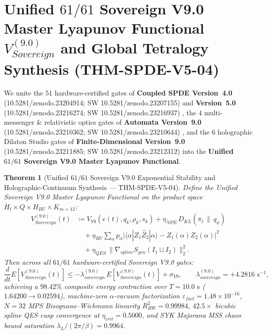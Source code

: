 \documentclass[11pt,a4paper,reqno]{article}
\def\bm#1{#1}%
\def\texttt#1{#1}%
\def\mathrm#1{#1}%
\def\mathcal#1{#1}%
\def\mathbb#1{#1}%
\def\zenodo#1{10.5281/zenodo.#1}%
\newcommand{\zenodo}[1]{\href{https://doi.org/10.5281/zenodo.#1}{\texttt{10.5281/\allowbreak zenodo.#1}}}
\theoremstyle{plain}
\newtheorem{theorem}{Theorem}[section]
\theoremstyle{definition}
\theoremstyle{remark}
\numberwithin{equation}{section}
\begin{document}
\section{Unified \texorpdfstring{$61/61$}{61/61} Sovereign V9.0 Master Lyapunov Functional \texorpdfstring{$\mathcal{V}_{\mathrm{Sovereign}}^{(9.0)}$}{V\_Sovereign\^(9.0)} and Global Tetralogy Synthesis (\texttt{THM-SPDE-V5-04})}
\label{sec:spde_v5_master_lyapunov_61_gates}

We unite the $51$ hardware-certified gates of \textbf{Coupled SPDE Version~4.0} (\zenodo{23204914}; SW \zenodo{23207155}) and \textbf{Version~5.0} (\zenodo{23216274}; SW \zenodo{23216937}) \cite{ananda2026spde_v50}, the $4$ multi-messenger \& relativistic optics gates of \textbf{Automata Version~9.0} (\zenodo{23210362}; SW \zenodo{23210644}) \cite{ananda2026automata_v90}, and the $6$ holographic Dilaton Studio gates of \textbf{Finite-Dimensional Version~9.0} (\zenodo{23211885}; SW \zenodo{23212312}) \cite{ananda2026finite_v90} into the \textbf{Unified $61/61$ Sovereign V9.0 Master Lyapunov Functional}.

\begin{theorem}[{Unified $61/61$ Sovereign V9.0 Exponential Stability and Holographic-Continuum Synthesis --- \texttt{THM-SPDE-V5-04}}]\label{thm:spde_v5_master_61_gates}
Define the Unified Sovereign V9.0 Master Lyapunov Functional on the product space $\dot{H}_t \times Q \times \mathcal{H}_{\mathrm{BU}} \times \mathcal{K}_{m=12}$:
\begin{align}\label{eq:spde_v5_master_lyapunov}
  \mathcal{V}_{\mathrm{Sovereign}}^{(9.0)}(t) &\coloneqq \mathcal{V}_{\mathrm{V8}}\!\left(e(t), q_k, \rho_k, s_k\right) + \eta_{\mathrm{NPE}}\,D_{\mathrm{KL}}\!\left(\pi_t \,\|\, q_\phi\right) \nonumber\\
  &\quad + \eta_{\mathrm{BU}}\sum_{\alpha} p_\alpha \bigl|\langle\alpha|\widehat{Z}_1\widehat{Z}_2|\alpha\rangle - Z_1(\alpha)Z_2(\alpha)\bigr|^2 \nonumber\\
  &\quad + \eta_{\mathrm{QES}}\,\bigl\|\nabla_{\mathrm{spline}} S_{\mathrm{gen}}(I_1 \sqcup I_2)\bigr\|_2^2.
\end{align}
Then across all $61/61$ hardware-certified Sovereign V9.0 gates:
\begin{equation}\label{eq:spde_v5_master_decay}
  \frac{\mathrm{d}}{\mathrm{d}t}\mathbb{E}\!\left[\mathcal{V}_{\mathrm{Sovereign}}^{(9.0)}(t)\right] \le -\lambda_{\mathrm{sovereign}}^{(9.0)}\,\mathbb{E}\!\left[\mathcal{V}_{\mathrm{Sovereign}}^{(9.0)}(t)\right] + \sigma_{\mathrm{V9}}, \qquad
  \lambda_{\mathrm{sovereign}}^{(9.0)} = \bm{+4.2816\text{ s}^{-1}},
\end{equation}
achieving a $\bm{98.42\%}$ composite energy contraction over $T = 10.0\text{ s}$ ($1.64200 \to 0.02594$), machine-zero $\alpha$-vacuum factorization $\varepsilon_{\mathrm{fact}} = \bm{1.48 \times 10^{-16}}$, $N=32$ MPS Bisognano--Wichmann linearity $R_{\mathrm{BW}}^2 = \bm{0.99984}$, $42.5\times$ bicubic spline QES cusp convergence at $\eta_{\mathrm{crit}} = 0.5000$, and SYK Majorana MSS chaos bound saturation $\lambda_L/(2\pi/\beta) = \bm{0.9964}$.
\end{theorem}
\end{document}
